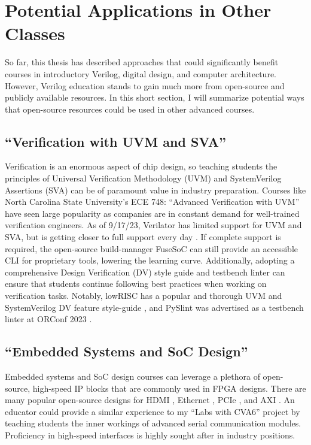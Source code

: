 
\chapter{Potential Applications in Other Classes}
\label{chapter:other_classes}

So far, this thesis has described approaches that could significantly benefit courses in introductory Verilog, digital design, and computer architecture. However, Verilog education stands to gain much more from open-source and publicly available resources. In this short section, I will summarize potential ways that open-source resources could be used in other advanced courses.

\section{``Verification with UVM and SVA''}

Verification is an enormous aspect of chip design, so teaching students the principles of Universal Verification Methodology (UVM) and SystemVerilog Assertions (SVA) can be of paramount value in industry preparation. Courses like North Carolina State University's ECE 748: ``Advanced Verification with UVM'' have seen large popularity as companies are in constant demand for well-trained verification engineers. As of 9/17/23, Verilator has limited support for UVM and SVA, but is getting closer to full support every day \cite{VerilatorUVM, BieganskiORConf, VerilatorSVA}. If complete support is required, the open-source build-manager FuseSoC can still provide an accessible CLI for proprietary tools, lowering the learning curve. Additionally, adopting a comprehensive Design Verification (DV) style guide and testbench linter can ensure that students continue following best practices when working on verification tasks. Notably, lowRISC has a popular and thorough UVM and SystemVerilog DV feature style-guide \cite{lowRISCstyleguides}, and PySlint was advertised as a testbench linter at ORConf 2023 \cite{paulORConf}.

\section{``Embedded Systems and SoC Design''}

Embedded systems and SoC design courses can leverage a plethora of open-source, high-speed IP blocks that are commonly used in FPGA designs. There are many popular open-source designs for HDMI \cite{hdlutilhdmiGitHub, projfdisplaycontrollerGitHub, cliffordwolfSimpleVOutGitHub}, Ethernet \cite{alexforencichverilogethernetGitHub}, PCIe \cite{alexforencichverilogpcieGitHub, enjoydigitallitepcieGitHub}, and AXI \cite{pulpplatformaxiGitHub, alexforencichverilogaxiGitHub}. An educator could provide a similar experience to my ``Labs with CVA6'' project by teaching students the inner workings of advanced serial communication modules. Proficiency in high-speed interfaces is highly sought after in industry positions.

